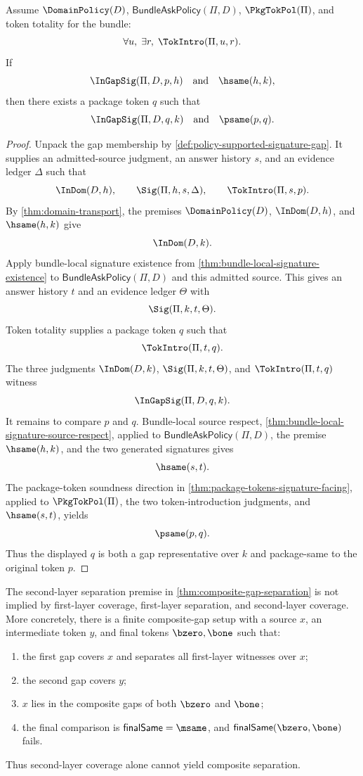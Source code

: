 \begin{theorem}
\label{thm:gap-hsame-transport-psame-representative}
Assume $\DomainPolicy(D)$, $\mathsf{BundleAskPolicy}(\Pi,D)$, $\PkgTokPol(\Pi)$, and token totality for the bundle:
$$
  \forall u,\;\exists r,\;\TokIntro(\Pi,u,r).
$$
If
$$
  \InGapSig(\Pi,D,p,h)
  \quad\text{and}\quad
  \hsame(h,k),
$$
then there exists a package token $q$ such that
$$
  \InGapSig(\Pi,D,q,k)
  \quad\text{and}\quad
  \psame(p,q).
$$
\end{theorem}

\begin{proof}
Unpack the gap membership by \autoref{def:policy-supported-signature-gap}. It supplies an admitted-source judgment, an answer history $s$, and an evidence ledger $\Delta$ such that
$$
  \InDom(D,h),
  \qquad
  \Sig(\Pi,h,s,\Delta),
  \qquad
  \TokIntro(\Pi,s,p).
$$
By \autoref{thm:domain-transport}, the premises $\DomainPolicy(D)$, $\InDom(D,h)$, and $\hsame(h,k)$ give
$$
  \InDom(D,k).
$$
Apply bundle-local signature existence from \autoref{thm:bundle-local-signature-existence} to $\mathsf{BundleAskPolicy}(\Pi,D)$ and this admitted source. This gives an answer history $t$ and an evidence ledger $\Theta$ with
$$
  \Sig(\Pi,k,t,\Theta).
$$
Token totality supplies a package token $q$ such that
$$
  \TokIntro(\Pi,t,q).
$$
The three judgments $\InDom(D,k)$, $\Sig(\Pi,k,t,\Theta)$, and $\TokIntro(\Pi,t,q)$ witness
$$
  \InGapSig(\Pi,D,q,k).
$$
It remains to compare $p$ and $q$. Bundle-local source respect, \autoref{thm:bundle-local-signature-source-respect}, applied to $\mathsf{BundleAskPolicy}(\Pi,D)$, the premise $\hsame(h,k)$, and the two generated signatures gives
$$
  \hsame(s,t).
$$
The package-token soundness direction in \autoref{thm:package-tokens-signature-facing}, applied to $\PkgTokPol(\Pi)$, the two token-introduction judgments, and $\hsame(s,t)$, yields
$$
  \psame(p,q).
$$
Thus the displayed $q$ is both a gap representative over $k$ and package-same to the original token $p$.
\end{proof}

\begin{theorem}
\label{thm:second-layer-separation-necessary-composite-gap}
The second-layer separation premise in \autoref{thm:composite-gap-separation} is not implied by first-layer coverage, first-layer separation, and second-layer coverage. More concretely, there is a finite composite-gap setup with a source $x$, an intermediate token $y$, and final tokens $\bzero,\bone$ such that:
\begin{enumerate}
  \item the first gap covers $x$ and separates all first-layer witnesses over $x$;
  \item the second gap covers $y$;
  \item $x$ lies in the composite gaps of both $\bzero$ and $\bone$;
  \item the final comparison is $\mathsf{finalSame}=\msame$, and $\mathsf{finalSame}(\bzero,\bone)$ fails.
\end{enumerate}
Thus second-layer coverage alone cannot yield composite separation.
\end{theorem}

